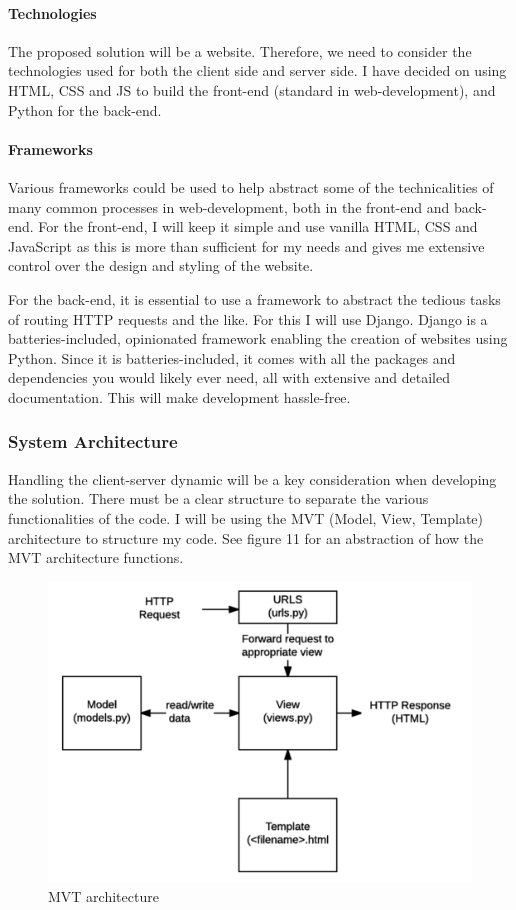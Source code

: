 \documentclass{article}
\begin{document}
\paragraph{Technologies}

The proposed solution will be a website. Therefore, we need to consider the technologies used for both the client side and server side. I have decided on using HTML, CSS and JS to build the front-end (standard in web-development), and Python for the back-end.

\paragraph{Frameworks}

Various frameworks could be used to help abstract some of the technicalities of many common processes in web-development, both in the front-end and back-end. For the front-end, I will keep it simple and use vanilla HTML, CSS and JavaScript as this is more than sufficient for my needs and gives me extensive control over the design and styling of the website. 

For the back-end, it is essential to use a framework to abstract the tedious tasks of routing HTTP requests and the like. For this I will use Django. Django is a batteries-included, opinionated framework enabling the creation of websites using Python. Since it is batteries-included, it comes with all the packages and dependencies you would likely ever need, all with extensive and detailed documentation. This will make development hassle-free. 

\subsubsection{System Architecture}

Handling the client-server dynamic will be a key consideration when developing the solution. There must be a clear structure to separate the various functionalities of the code. I will be using the MVT (Model, View, Template) architecture to structure my code. See figure 11 for an abstraction of how the MVT architecture functions.

\begin{figure}
  \centering
  \includegraphics[width=1\textwidth]{Figure 11.png}
  \caption{MVT architecture}
\end{figure}
\end{document}

